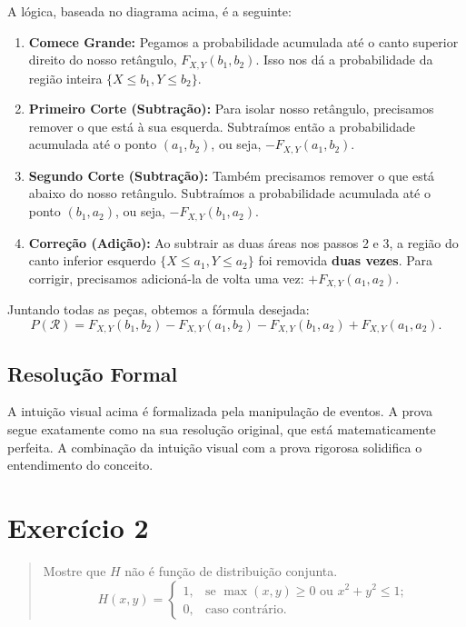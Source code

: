 \documentclass[12pt]{article}
\begin{document}
A lógica, baseada no diagrama acima, é a seguinte:

\begin{enumerate}
    \item \textbf{Comece Grande:} Pegamos a probabilidade acumulada até o canto superior direito do nosso retângulo, \textbf{$F_{X,Y}(b_1, b_2)$}. Isso nos dá a probabilidade da região inteira $\{X \le b_1, Y \le b_2\}$.
    
    \item \textbf{Primeiro Corte (Subtração):} Para isolar nosso retângulo, precisamos remover o que está à sua esquerda. Subtraímos então a probabilidade acumulada até o ponto $(a_1, b_2)$, ou seja, \textbf{$-F_{X,Y}(a_1, b_2)$}.
    
    \item \textbf{Segundo Corte (Subtração):} Também precisamos remover o que está abaixo do nosso retângulo. Subtraímos a probabilidade acumulada até o ponto $(b_1, a_2)$, ou seja, \textbf{$-F_{X,Y}(b_1, a_2)$}.
    
    \item \textbf{Correção (Adição):} Ao subtrair as duas áreas nos passos 2 e 3, a região do canto inferior esquerdo $\{X \le a_1, Y \le a_2\}$ foi removida \textbf{duas vezes}. Para corrigir, precisamos adicioná-la de volta uma vez: \textbf{$+F_{X,Y}(a_1, a_2)$}.
\end{enumerate}

Juntando todas as peças, obtemos a fórmula desejada:
\[ P(\mathcal{R}) = F_{X,Y}(b_1, b_2) - F_{X,Y}(a_1, b_2) - F_{X,Y}(b_1, a_2) + F_{X,Y}(a_1, a_2). \]

\subsection*{Resolução Formal}
A intuição visual acima é formalizada pela manipulação de eventos. A prova segue exatamente como na sua resolução original, que está matematicamente perfeita. A combinação da intuição visual com a prova rigorosa solidifica o entendimento do conceito.

\section*{Exercício 2}

\begin{quote}
Mostre que $H$ não é função de distribuição conjunta.
\[ H(x,y) = \begin{cases} 1, & \text{se } \max(x,y) \ge 0 \text{ ou } x^2+y^2 \le 1; \\ 0, & \text{caso contrário.} \end{cases} \]
\end{quote}
\end{document}
